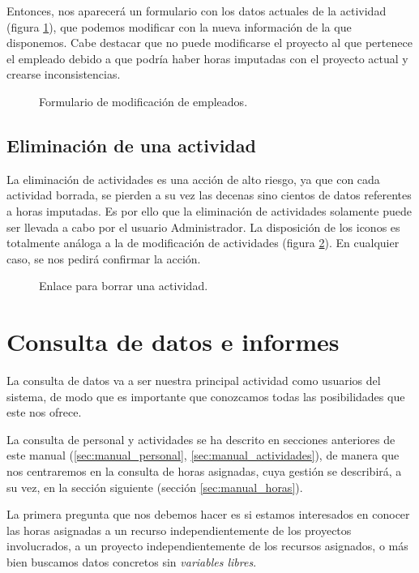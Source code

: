 Entonces, nos aparecerá un formulario con los datos actuales de la actividad
(figura \ref{fig:form_mod_actividad}), que podemos modificar con la nueva
información de la que disponemos. Cabe destacar que no puede modificarse el
proyecto al que pertenece el empleado debido a que podría haber horas imputadas
con el proyecto actual y crearse inconsistencias.

\begin{figure}
\centering
{}
\caption{Formulario de modificación de empleados.}
\label{fig:form_mod_actividad}
\end{figure}

\subsection{Eliminación de una actividad}

La eliminación de actividades es una acción de alto riesgo, ya que con cada
actividad borrada, se pierden a su vez las decenas sino cientos de datos
referentes a horas imputadas. Es por ello que la eliminación de actividades
solamente puede ser llevada a cabo por el usuario Administrador. La
disposición de los iconos es totalmente análoga a la de modificación de
actividades (figura \ref{fig:bor_actividad}). En cualquier caso, se nos pedirá
confirmar la acción.

\begin{figure}
\centering
{}
\caption{Enlace para borrar una actividad.}
\label{fig:bor_actividad}
\end{figure}

\section{Consulta de datos e informes}

La consulta de datos va a ser nuestra principal actividad como usuarios del
sistema, de modo que es importante que conozcamos todas las posibilidades que
este nos ofrece.

La consulta de personal y actividades se ha descrito en secciones
anteriores de este manual (\ref{sec:manual_personal},
\ref{sec:manual_actividades}), de manera que nos centraremos en la consulta de
horas asignadas, cuya gestión se describirá, a su vez, en la sección siguiente
(sección \ref{sec:manual_horas}).

La primera pregunta que nos debemos hacer es si estamos interesados en conocer
las horas asignadas a un recurso independientemente de los proyectos
involucrados, a un proyecto independientemente de los recursos asignados, o más
bien buscamos datos concretos sin \textit{variables libres}.

